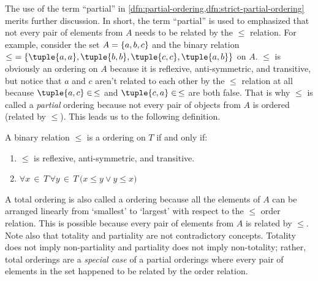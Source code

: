 \vspace{0.3cm}
\noindent
The use of the term ``partial'' in \cref{dfn:partial-ordering,dfn:strict-partial-ordering} merits further discussion.
In short, the term ``partial'' is used to emphasized that not every pair of elements from \( A \) needs to be related
by the \( \leq \) relation. For example, consider the set \( A = \mleft\{ a,b,c \mright\} \) and the binary relation
\( \leq \,\, = \mleft\{ \tuple{a,a}, \tuple{b,b}, \tuple{c,c}, \tuple{a,b} \mright\} \) on \( A \). \( \leq \) is obviously an
ordering on \( A \) because it is reflexive, anti-symmetric, and transitive, but notice that \( a \) and \( c \) aren't related to
each other by the \( \leq \) relation at all because \( \tuple{a,c} \in \, \leq \) and \( \tuple{c,a} \in \, \leq \) are both false.
That is why \( \leq \) is called a \emph{partial} ordering because not every pair of objects from \( A \) is ordered (related by \( \leq \)).
This leads us to the following definition.

\begin{dfn}
    \label{dfn:total-non-strict-ordering}
    A binary relation \( \leq \) is a  ordering on \( T \) if and only if:
    \begin{enumerate}[topsep=2pt,label=\texttt{\textup{(\alph*)}}]
        \item \( \leq \) is reflexive, anti-symmetric, and transitive.
        \item \( \forall x\,{\in}\,T \, \forall y\,{\in}\,T \, \big( x \leq y \lor y \leq x \big) \)
    \end{enumerate}
\end{dfn}

\noindent
A total ordering is also called a  ordering because all the elements of \( A \)
can be arranged linearly from `smallest' to `largest' with respect to the \( \leq \) order relation.
This is possible because every pair of elements from \( A \) is related by \( \leq \). Note also that
totality and partiality are not contradictory concepts. Totality does not imply non-partiality and
partiality does not imply non-totality; rather, total orderings are a \emph{special case} of a partial
orderings where every pair of elements in the set happened to be related by the order relation.

